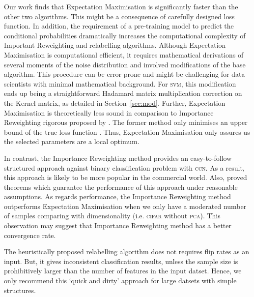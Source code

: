 \documentclass[12pt]{article} %
\newcommand{\svm}{\textsc{svm}}
\begin{document}
Our work finds that Expectation Maximisation is significantly faster than the other two algorithms. This might be a consequence of carefully designed loss function. In addition, the requirement of a pre-training model to predict the conditional probabilities dramatically increases the computational complexity of Important Reweighting and relabelling algorithms. Although Expectation Maximisation is computational efficient, it requires mathematical derivations of several moments of the noise distribution and involved modifications of the base algorithm. This procedure can be error-prone and might be challenging for data scientists with minimal mathematical background. For \svm , this modification ends up being a straightforward Hadamard matrix multiplication correction on the Kernel matrix, as detailed in Section~\ref{sec:mod}. Further, Expectation Maximisation is theoretically less sound in comparison to Importance Reweighting rigorous proposed by \citet{liu2016classification}. The former method only minimises an upper bound of the true loss function \citep{NIPS1999_1672}. Thus, Expectation Maximisation only assures us the selected parameters are a local optimum.

In contrast, the Importance Reweighting method provides an easy-to-follow structured approach against binary classification problem with \textsc{ccn}. As a result, this approach is likely to be more popular in the commercial world. Also, \citet{liu2016classification} proved theorems which guarantee the performance of this approach under reasonable assumptions. As regards performance, the Importance Reweighting method outperforms Expectation Maximisation when we only have a moderated number of samples comparing with dimensionality (i.e. \textsc{cifar} without \textsc{pca}). This observation may suggest that Importance Reweighting method has a better convergence rate. 

The heuristically proposed relabelling algorithm does not requires flip rates as an input. But, it gives inconsistent classification results, unless the sample size is prohibitively larger than the number of features in the input datset.  Hence, we only recommend this `quick and dirty' approach for large datsets with simple structures. 

\end{document}
